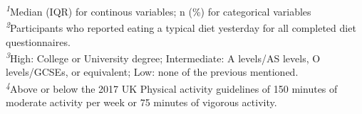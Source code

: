 \documentclass[sn-basic,Numbered,pdflatex]{sn-jnl}
\begin{document}
\begin{minipage}{\linewidth}
\textsuperscript{\textit{1}}Median (IQR) for continous variables; n (\%) for categorical variables\\
\textsuperscript{\textit{2}}Participants who reported eating a typical diet yesterday for all completed diet questionnaires.\\
\textsuperscript{\textit{3}}High: College or University degree;
Intermediate: A levels/AS levels, O levels/GCSEs, or equivalent;
Low: none of the previous mentioned.\\
\textsuperscript{\textit{4}}Above or below the 2017 UK Physical activity guidelines of 150 minutes of moderate activity per week or 75 minutes of vigorous activity.\\
\end{minipage}
\endgroup

\newpage

\noindent
\end{document}
